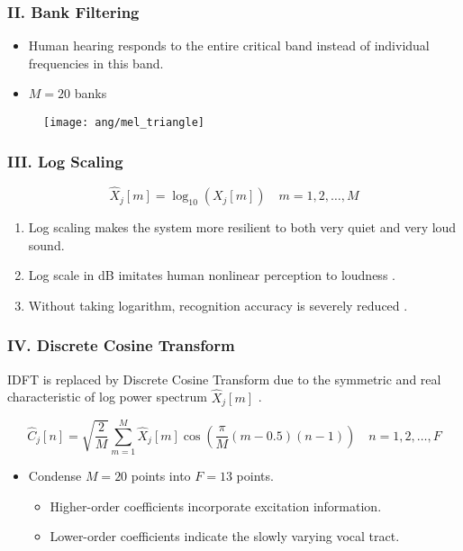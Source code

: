 
\begin{frame}
\frametitle{II. Bank Filtering}
\begin{itemize}
	\item Human hearing responds to the entire critical band instead of individual frequencies in this band.
	\item $M = 20$ banks
\end{itemize}

\begin{figure}[H]
\centering
\texttt{[image: ang/mel\_triangle]}
\end{figure}
\end{frame}


\begin{frame}
\frametitle{III. Log Scaling}
\begin{equation}
\hat{X}_j[m] = \log_{10}(X_j[m]) \quad m = 1, 2, \dots, M
\end{equation}

\begin{enumerate}
\item Log scaling makes the system more resilient to both very quiet and very loud sound.
\item Log scale in dB imitates human nonlinear perception to loudness \cite{farin2008mathematical}.
\item Without taking logarithm, recognition accuracy is severely reduced \cite{tan2008automatic}.
\end{enumerate}
\end{frame}


\begin{frame}
\frametitle{IV. Discrete Cosine Transform}
IDFT is replaced by Discrete Cosine Transform due to the symmetric and real characteristic of log power spectrum $\hat{X}_j[m]$ \cite{picone1993signal, iser2008bandwidth}.

\begin{equation}
\hat{C}_j[n] = \sqrt{\frac{2}{M}} \sum^{M}_{m=1} \hat{X}_j[m] \cos \left( \frac{\pi}{M} (m - 0.5) (n-1) \right) \quad n = 1, 2, \dots, F
\end{equation}

\begin{itemize}
	\item Condense $M = 20$ points into $F = 13$ points. \cite{tan2008automatic}
	\begin{itemize}
		\item Higher-order coefficients incorporate excitation information.
		\item Lower-order coefficients indicate the slowly varying vocal tract.
	\end{itemize}
\end{itemize}
\end{frame}
